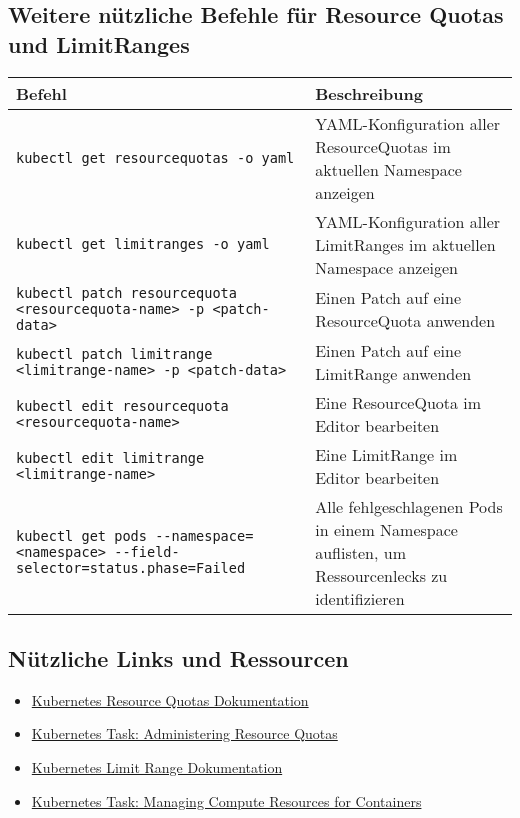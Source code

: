 \subsection{Weitere nützliche Befehle für Resource Quotas und LimitRanges}
\begin{tabular}{|p{}|p{}|}
\hline
\textbf{Befehl} & \textbf{Beschreibung} \\
\hline
\texttt{kubectl get resourcequotas -o yaml} & YAML-Konfiguration aller ResourceQuotas im aktuellen Namespace anzeigen \\
\texttt{kubectl get limitranges -o yaml} & YAML-Konfiguration aller LimitRanges im aktuellen Namespace anzeigen \\
\texttt{kubectl patch resourcequota <resourcequota-name> -p <patch-data>} & Einen Patch auf eine ResourceQuota anwenden \\
\texttt{kubectl patch limitrange <limitrange-name> -p <patch-data>} & Einen Patch auf eine LimitRange anwenden \\
\texttt{kubectl edit resourcequota <resourcequota-name>} & Eine ResourceQuota im Editor bearbeiten \\
\texttt{kubectl edit limitrange <limitrange-name>} & Eine LimitRange im Editor bearbeiten \\
\texttt{kubectl get pods {-}{-}namespace=<namespace> {-}{-}field-selector=status.phase=Failed} & Alle fehlgeschlagenen Pods in einem Namespace auflisten, um Ressourcenlecks zu identifizieren \\
\hline
\end{tabular}

\subsection*{Nützliche Links und Ressourcen}
\begin{itemize}
    \item \href{https://kubernetes.io/docs/concepts/policy/resource-quotas/}{Kubernetes Resource Quotas Dokumentation}
    \item \href{https://kubernetes.io/docs/tasks/administer-cluster/quota-api-object/}{Kubernetes Task: Administering Resource Quotas}
    \item \href{https://kubernetes.io/docs/concepts/policy/limit-range/}{Kubernetes Limit Range Dokumentation}
    \item \href{https://kubernetes.io/docs/tasks/administer-cluster/manage-resources/memory-default-namespace/}{Kubernetes Task: Managing Compute Resources for Containers}
\end{itemize}



